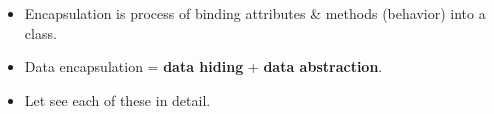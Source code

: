 \setlength{\columnsep}{3pt}
\begin{flushleft}

	\begin{itemize}
		\item Encapsulation is process of binding attributes \& methods (behavior) into a class.
		

		\item Data encapsulation = \textbf{data hiding} + \textbf{data abstraction}.
		\item Let see each of these in detail.
	\end{itemize}	
	
\end{flushleft}
